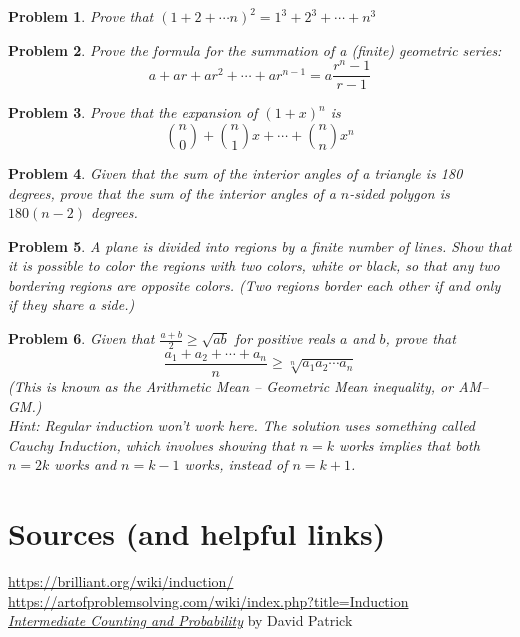 \documentclass[a4paper]{scrartcl}
\newtheorem{u_problem}{Problem}
\begin{document}
\begin{u_problem}
	Prove that $(1 + 2 + \cdots n)^2 = 1^3 + 2^3 + \cdots + n^3$
\end{u_problem}

\begin{u_problem}
	Prove the formula for the summation of a (finite) geometric series:
	\[a + ar + ar^2 + \cdots + ar^{n-1} = a\frac{r^n - 1}{r-1}\]
\end{u_problem}

\begin{u_problem}
	Prove that the expansion of ${\left(1 + x\right)}^n$ is
	\[\binom{n}{0} + \binom{n}{1}x + \cdots + \binom{n}{n}x^n\]
\end{u_problem}

\begin{u_problem}
	Given that the sum of the interior angles of a triangle is 180 degrees, prove that the sum of the interior angles of a $n$-sided polygon is $180(n-2)$ degrees.
\end{u_problem}

\begin{u_problem}
	A plane is divided into regions by a finite number of lines. Show that it is possible to color the regions with two colors, white or black, so that any two bordering regions are opposite colors. (Two regions border each other if and only if they share a side.)
\end{u_problem}

\begin{u_problem}
	Given that $\frac{a+b}{2} \geq \sqrt{ab}$ for positive reals $a$ and $b$, prove that \[\frac{a_1 + a_2 + \cdots + a_n}{n} \geq \sqrt[n]{a_1 a_2 \cdots a_n}\] (This is known as the Arithmetic Mean -- Geometric Mean inequality, or AM--GM.)  \\
	Hint: Regular induction won't work here. The solution uses something called Cauchy Induction, which involves showing that $n=k$ works implies that both $n=2k$ works and $n=k-1$ works, instead of $n=k+1$.
\end{u_problem}
\section{Sources (and helpful links)}
\url{https://brilliant.org/wiki/induction/} \\
\url{https://artofproblemsolving.com/wiki/index.php?title=Induction} \\
\href{https://artofproblemsolving.com/store/book/intermediate-counting}{\emph{Intermediate Counting and Probability}} by David Patrick
\end{document}
